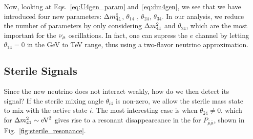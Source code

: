 Now, looking at Eqs.~\ref{eq:U4gen_param} and~\ref{eq:dm4gen}, we see that we have introduced four new parameters: $\dm[41]$, $\theta_{14}$
, $\theta_{24}$, $\theta_{34}$. In our analysis, we reduce the number of parameters by only considering $\dm[41]$ and $\theta_{24}$, which are 
the most important for the $\nu_\mu$ oscillations. In fact, one can supress the $e$ channel by letting $\theta_{14} = 0$ in the \si{\GeV} to \si{\TeV} range, thus 
using a two-flavor neutrino approximation.

\subsection{Sterile Signals}
Since the new neutrino does not interact weakly, how do we then detect its signal? If the sterile mixing angle $\theta_{i4}$ is non-zero, 
we allow the sterile mass state to mix with the active state $i$. The most interesting case is when $\theta_{24} \neq 0$, 
which for $\dm[41] \sim \si{\eV \squared}$ gives rise to a resonant disappeareance in the for $P_{\bar{\mu}\bar{\mu}}$, shown in Fig.~\ref{fig:sterile_resonance}.

